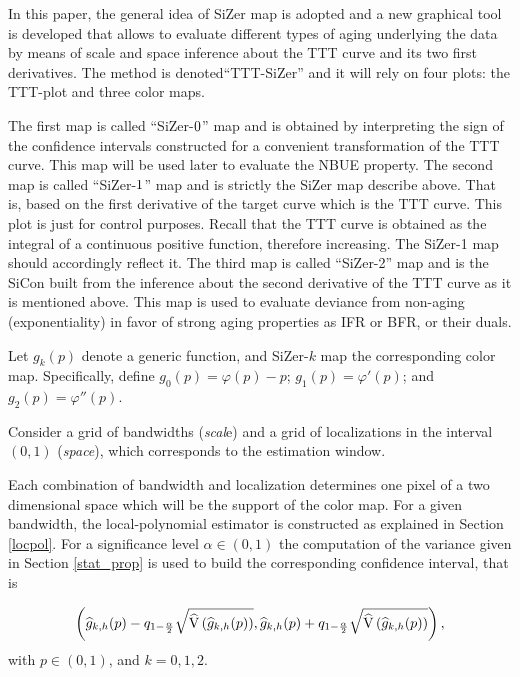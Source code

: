 \documentclass[preprint,12pt]{elsarticle}
\begin{document}
In this paper, the general idea of SiZer map is adopted and  a new graphical tool is developed that allows to evaluate different types of aging underlying the data by means of scale and space inference about the TTT curve and its two first derivatives. The method is denoted``TTT-SiZer'' and it will rely on four plots: the TTT-plot and three color maps.


The first map is called ``SiZer-${\rm 0}$'' map and is obtained by interpreting the sign of the confidence intervals constructed for a convenient transformation of the TTT curve. This map will be used later to evaluate the NBUE property.
The second map is called ``SiZer-${\rm 1}$'' map and is strictly the SiZer map describe above. That is, based on the first derivative of the target curve which is the TTT curve. This plot is just for control purposes. Recall that the TTT curve is obtained as the integral of a continuous positive function, therefore increasing. The  SiZer-1 map should accordingly reflect it. The third map is called ``SiZer-{\rm 2}'' map and is the  SiCon  built from the inference about the second derivative of the TTT curve as it is mentioned above. This map is used to evaluate deviance from non-aging (exponentiality) in favor of strong aging properties as IFR or BFR, or their duals.


Let $g_k(p)$ denote a generic function, and SiZer-${ k}$ map the corresponding color map. Specifically, define $g_0(p)=\varphi(p) - p$; $g_1(p)=\varphi'(p)$; and  $g_2(p)=\varphi''(p)$. 

Consider a grid of bandwidths (\textit{scal}e) and a grid of localizations in the interval $(0,1)$  (\textit{space}), which corresponds to the estimation window. 

Each combination of bandwidth and localization determines one pixel of a two dimensional space which will be the support of the color map. For a given bandwidth, the local-polynomial estimator is constructed as explained in Section \ref{locpol}. For a significance level $\alpha \in (0,1)$ the computation of the variance given in Section \ref{stat_prop} is used to build the corresponding confidence interval, that is
 
\begin{equation}\label{ci1}
\left(\widehat{g}_{k,h}(p)-q_{1-\frac{\alpha}{2}}\sqrt{{\rm \widehat{V}}\left(\widehat{g}_{k,h}(p)\right)},\widehat{g}_{k,h}(p)+q_{1-\frac{\alpha}{2}}\sqrt{{\rm \widehat{V}}\left(\widehat{g}_{k,h}(p)\right)}\right),
\end{equation}
 with $p \in (0,1)$, and $k=0,1,2$.
\end{document}
